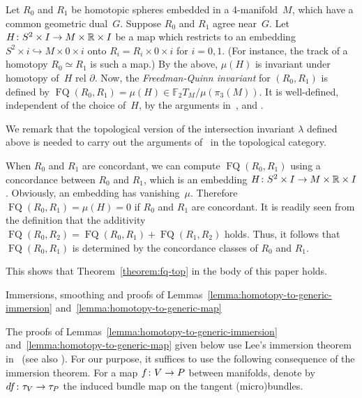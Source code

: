 \documentclass[11pt]{amsart}
\makeatletter
\def\subsection{\@startsection{subsection}{2}%
  \z@{-.8\linespacing\@plus-.3\linespacing}{.5\linespacing\@plus.2\linespacing}%
  {\normalfont\bfseries\large}}
\def\to{\mathchoice{\longrightarrow}{\rightarrow}{\rightarrow}{\rightarrow}}
\theoremstyle{definition}
\theoremstyle{theorem-giventitle}
\theoremstyle{definition-giventitle}
\numberwithin{equation}{section}
\def\R{\mathbb{R}}
\def\bF{{\mathbb{F}}}
\def\FQ{\operatorname{FQ}}
\makeatother
\begin{document}
Let $R_0$ and $R_1$ be homotopic spheres embedded in a 4-manifold~$M$, which have a common geometric dual~$G$.
Suppose $R_0$ and $R_1$ agree near~$G$.
Let $H\colon S^2\times I \to M\times\R\times I$ be a map which restricts to an embedding $S^2\times i \hookrightarrow M\times 0\times i$ onto $R_i=R_i\times 0\times i$ for $i=0,1$.
(For instance, the track of a homotopy $R_0\simeq R_1$ is such a map.)
By the above, $\mu(H)$ is invariant under homotopy of~$H$ rel $\partial$.
Now, the \emph{Freedman-Quinn invariant} for $(R_0,R_1)$ is defined by $\FQ(R_0,R_1)=\mu(H)\in \bF_2 T_M / \mu(\pi_3(M))$.
It is well-defined, independent of the choice of~$H$, by the arguments in~\cite[Lemma~4.5]{Schneiderman-Teichner:2022-1}, \cite[Proposition~4.9]{Klug-Miller:2021-1} and \cite[Proposition~3.3]{Klug-Miller:2022-1}.

We remark that the topological version of the intersection invariant $\lambda$ defined above is needed to carry out the arguments of~\cite[Lemmas~4.1 and 4.5]{Schneiderman-Teichner:2022-1} in the topological category.

When $R_0$ and $R_1$ are concordant, we can compute $\FQ(R_0,R_1)$ using a concordance between $R_0$ and $R_1$, which is an embedding $H\colon S^2\times I \to M\times\R\times I$.
Obviously, an embedding has vanishing~$\mu$.
Therefore $\FQ(R_0,R_1) = \mu(H) = 0$ if $R_0$ and $R_1$ are concordant.
It is readily seen from the definition that the additivity $\FQ(R_0,R_2)=\FQ(R_0,R_1)+\FQ(R_1,R_2)$ holds.
Thus, it follows that $\FQ(R_0,R_1)$ is determined by the concordance classes of $R_0$ and $R_1$.

This shows that Theorem~\ref{theorem:fq-top} in the body of this paper holds.



\subsection{Immersions, smoothing and proofs of Lemmas~\ref{lemma:homotopy-to-generic-immersion} and~\ref{lemma:homotopy-to-generic-map}}
\label{subsection:immersion-smoothing-generic-maps}

The proofs of Lemmas~\ref{lemma:homotopy-to-generic-immersion} and~\ref{lemma:homotopy-to-generic-map} given below use Lee's immersion theorem in~\cite{Lees:1969-1} (see also \cite{Lashof:1969-1,Lashof:1971-1}).
For our purpose, it suffices to use the following consequence of the immersion theorem.
For a map $f\colon V\to P$ between manifolds, denote by $df \colon \tau_V \to \tau_P$ the induced bundle map on the tangent (micro)bundles.
\end{document}
